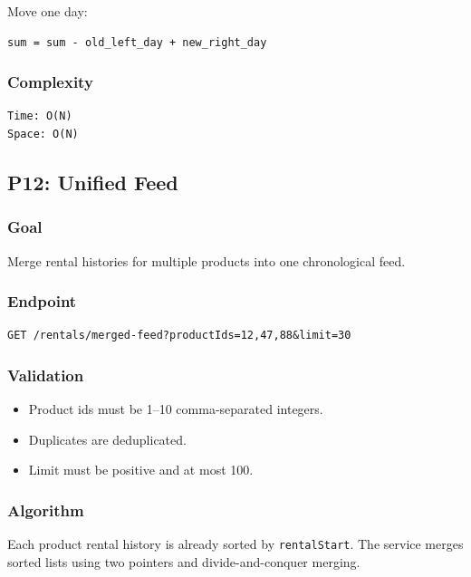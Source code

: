 \documentclass[11pt,a4paper]{article}
\begin{document}
Move one day:

\begin{lstlisting}
sum = sum - old_left_day + new_right_day
\end{lstlisting}

\subsubsection*{Complexity}

\begin{lstlisting}
Time: O(N)
Space: O(N)
\end{lstlisting}

\subsection{P12: Unified Feed}

\subsubsection*{Goal}
Merge rental histories for multiple products into one chronological feed.

\subsubsection*{Endpoint}

\begin{lstlisting}
GET /rentals/merged-feed?productIds=12,47,88&limit=30
\end{lstlisting}

\subsubsection*{Validation}

\begin{itemize}
  \item Product ids must be 1--10 comma-separated integers.
  \item Duplicates are deduplicated.
  \item Limit must be positive and at most 100.
\end{itemize}

\subsubsection*{Algorithm}

Each product rental history is already sorted by \texttt{rentalStart}. The service merges sorted lists using two pointers and divide-and-conquer merging.
\end{document}
